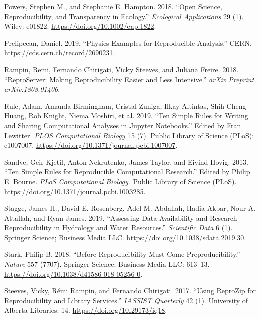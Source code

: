 \documentclass[onecolumn]{article}
\begin{document}
\leavevmode\hypertarget{ref-powers2019open}{}%
Powers, Stephen M., and Stephanie E. Hampton. 2018. ``Open Science,
Reproducibility, and Transparency in Ecology.'' \emph{Ecological
Applications} 29 (1). Wiley: e01822.
\url{https://doi.org/10.1002/eap.1822}.

\leavevmode\hypertarget{ref-prelipcean2019physics}{}%
Prelipcean, Daniel. 2019. ``Physics Examples for Reproducible
Analysis.'' CERN. \url{https://cds.cern.ch/record/2690231}.

\leavevmode\hypertarget{ref-rampin2018reproserver}{}%
Rampin, Remi, Fernando Chirigati, Vicky Steeves, and Juliana Freire.
2018. ``ReproServer: Making Reproducibility Easier and Less Intensive.''
\emph{arXiv Preprint arXiv:1808.01406}.

\leavevmode\hypertarget{ref-rule2019ten}{}%
Rule, Adam, Amanda Birmingham, Cristal Zuniga, Ilkay Altintas,
Shih-Cheng Huang, Rob Knight, Niema Moshiri, et al. 2019. ``Ten Simple
Rules for Writing and Sharing Computational Analyses in Jupyter
Notebooks.'' Edited by Fran Lewitter. \emph{PLOS Computational Biology}
15 (7). Public Library of Science (PLoS): e1007007.
\url{https://doi.org/10.1371/journal.pcbi.1007007}.

\leavevmode\hypertarget{ref-sandve2013ten}{}%
Sandve, Geir Kjetil, Anton Nekrutenko, James Taylor, and Eivind Hovig.
2013. ``Ten Simple Rules for Reproducible Computational Research.''
Edited by Philip E. Bourne. \emph{PLoS Computational Biology}. Public
Library of Science (PLoS).
\url{https://doi.org/10.1371/journal.pcbi.1003285}.

\leavevmode\hypertarget{ref-stagge2019assessing}{}%
Stagge, James H., David E. Rosenberg, Adel M. Abdallah, Hadia Akbar,
Nour A. Attallah, and Ryan James. 2019. ``Assessing Data Availability
and Research Reproducibility in Hydrology and Water Resources.''
\emph{Scientific Data} 6 (1). Springer Science; Business Media LLC.
\url{https://doi.org/10.1038/sdata.2019.30}.

\leavevmode\hypertarget{ref-stark2018before}{}%
Stark, Philip B. 2018. ``Before Reproducibility Must Come
Preproducibility.'' \emph{Nature} 557 (7707). Springer Science; Business
Media LLC: 613--13. \url{https://doi.org/10.1038/d41586-018-05256-0}.

\leavevmode\hypertarget{ref-steeves2018using}{}%
Steeves, Vicky, Rémi Rampin, and Fernando Chirigati. 2017. ``Using
ReproZip for Reproducibility and Library Services.'' \emph{IASSIST
Quarterly} 42 (1). University of Alberta Libraries: 14.
\url{https://doi.org/10.29173/iq18}.
\end{document}
